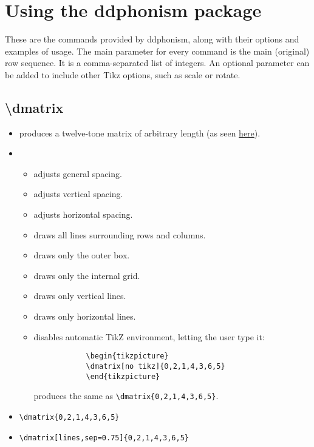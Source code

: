 \documentclass{article}
\begin{document}
	\begin{multicols}{2}
		
		
		
		
		\bigskip
	\end{multicols}

	\section{Using the \textsf{ddphonism} package}
	These are the commands provided by \textsf{ddphonism}, along with their options and examples of usage. The main parameter for every command is the main (original) row sequence. It is a comma-separated list of integers. An optional parameter can be added to include other Tikz options, such as \textsf{scale} or \textsf{rotate}.

	\newcommand{\I}[1]{\item[\texttt{$\backslash$#1}]\quad}	
	\newcommand{\Ii}[1]{\item[\textsf{#1}]\quad}
	
	\subsection{\textbackslash dmatrix}
	\begin{itemize}
		\I{dmatrix} produces a twelve-tone matrix of arbitrary length (as seen \href{https://celrm.github.io/matrices/}{here}). 

		\item[Options:]
		\begin{itemize}
			\Ii{sep} adjusts general spacing.
			\Ii{vsep} adjusts vertical spacing.
			\Ii{hsep} adjusts horizontal spacing.
			\Ii{lines} draws all lines surrounding rows and columns.
			\Ii{outside lines} draws only the outer box.
			\Ii{inside lines} draws only the internal grid.
			\Ii{vlines} draws only vertical lines.
			\Ii{hlines} draws only horizontal lines.
			\Ii{no tikz} disables automatic TikZ environment, letting the user type it:
			\begin{verbatim}
			\begin{tikzpicture}
			\dmatrix[no tikz]{0,2,1,4,3,6,5}
			\end{tikzpicture}
			\end{verbatim} produces the same as \verb|\dmatrix{0,2,1,4,3,6,5}|.
		\end{itemize}
		
		\item[Example:] \verb|\dmatrix{0,2,1,4,3,6,5}|
		
		
		\item[Example:] \verb|\dmatrix[lines,sep=0.75]{0,2,1,4,3,6,5}|
				
		
	\end{itemize}
		
\end{document}
